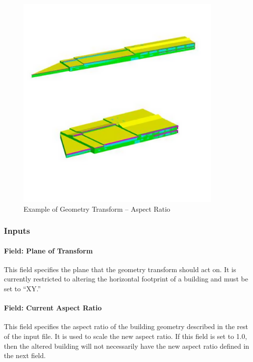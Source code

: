 \begin{figure}[hbtp] %
\centering
\includegraphics[width=0.9\textwidth, height=0.9\textheight, keepaspectratio=true]{media/image078.png}
\caption{Example of Geometry Transform -- Aspect Ratio \protect \label{fig:example-of-geometry-transform-aspect-ratio}}
\end{figure}

\subsubsection{Inputs}\label{inputs-16}

\paragraph{Field: Plane of Transform}\label{field-plane-of-transform}

This field specifies the plane that the geometry transform should act on. It is currently restricted to altering the horizontal footprint of a building and must be set to ``XY.''

\paragraph{Field: Current Aspect Ratio}\label{field-current-aspect-ratio}

This field specifies the aspect ratio of the building geometry described in the rest of the input file. It is used to scale the new aspect ratio. If this field is set to 1.0, then the altered building will not necessarily have the new aspect ratio defined in the next field.

